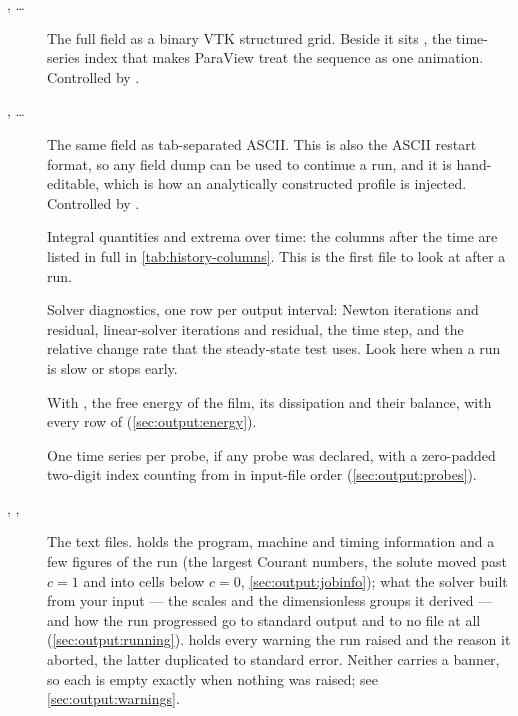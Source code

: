 \begin{description}
  \item[, \dots] The full field as a binary VTK
    structured grid. Beside it sits , the time-series
    index that makes ParaView treat the sequence as one animation. Controlled
    by .
  \item[, \dots] The same field as tab-separated ASCII.
    This is also the ASCII restart format, so any field dump can be used to
    continue a run, and it is hand-editable, which is how an analytically
    constructed profile is injected. Controlled by
    .
  \item[] Integral quantities and extrema over time:
    the columns after the time are listed in full in
    \cref{tab:history-columns}. This is the first file to look at after a run.
  \item[] Solver diagnostics, one row per output interval: Newton iterations and
    residual, linear-solver iterations and residual, the time step, and the
    relative change rate that the steady-state test uses. Look here when a run
    is slow or stops early.
  \item[] With , the free energy of
    the film, its dissipation and their balance, with every row of
     (\cref{sec:output:energy}).
  \item[] One time series per probe, if any probe was
    declared, with  a zero-padded two-digit index counting from
     in input-file order (\cref{sec:output:probes}).
  \item[, , ] The
    text files.  holds the program, machine and timing
    information and a few figures of the run (the largest Courant numbers,
    the solute moved past $c = 1$ and into cells below $c = 0$, \cref{sec:output:jobinfo}); what the solver built from your input --- the scales and
    the dimensionless groups it derived --- and how the run progressed go to
    standard output and to no file at all (\cref{sec:output:running}).
     holds every warning the run raised and
     the reason it aborted, the latter duplicated to
    standard error. Neither carries a banner, so each is empty exactly when
    nothing was raised; see \cref{sec:output:warnings}.
\end{description}

